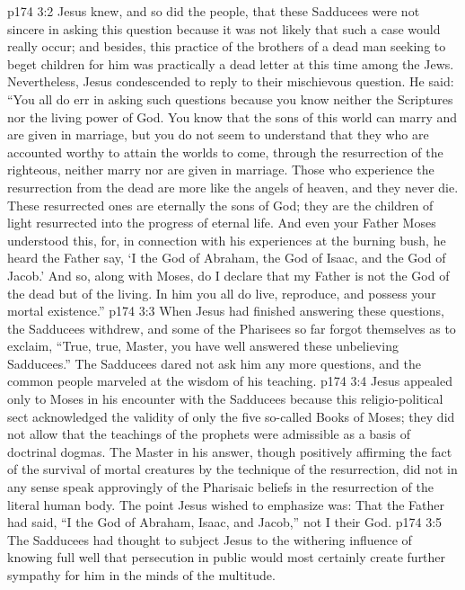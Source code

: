 \vs p174 3:2 Jesus knew, and so did the people, that these Sadducees were not sincere in asking this question because it was not likely that such a case would really occur; and besides, this practice of the brothers of a dead man seeking to beget children for him was practically a dead letter at this time among the Jews. Nevertheless, Jesus condescended to reply to their mischievous question. He said: \textcolor{ubdarkred}{“You all do err in asking such questions because you know neither the Scriptures nor the living power of God. You know that the sons of this world can marry and are given in marriage, but you do not seem to understand that they who are accounted worthy to attain the worlds to come, through the resurrection of the righteous, neither marry nor are given in marriage. Those who experience the resurrection from the dead are more like the angels of heaven, and they never die. These resurrected ones are eternally the sons of God; they are the children of light resurrected into the progress of eternal life. And even your Father Moses understood this, for, in connection with his experiences at the burning bush, he heard the Father say, ‘I  the God of Abraham, the God of Isaac, and the God of Jacob.’ And so, along with Moses, do I declare that my Father is not the God of the dead but of the living. In him you all do live, reproduce, and possess your mortal existence.”}\plusone
\vs p174 3:3 When Jesus had finished answering these questions, the Sadducees withdrew, and some of the Pharisees so far forgot themselves as to exclaim, “True, true, Master, you have well answered these unbelieving Sadducees.” The Sadducees dared not ask him any more questions, and the common people marveled at the wisdom of his teaching.
\pc \vs p174 3:4 Jesus appealed only to Moses in his encounter with the Sadducees because this religio\hyp{}political sect acknowledged the validity of only the five so\hyp{}called Books of Moses; they did not allow that the teachings of the prophets were admissible as a basis of doctrinal dogmas. The Master in his answer, though positively affirming the fact of the survival of mortal creatures by the technique of the resurrection, did not in any sense speak approvingly of the Pharisaic beliefs in the resurrection of the literal human body. The point Jesus wished to emphasize was: That the Father had said, “I  the God of Abraham, Isaac, and Jacob,” not I  their God.
\vs p174 3:5 The Sadducees had thought to subject Jesus to the withering influence of  knowing full well that persecution in public would most certainly create further sympathy for him in the minds of the multitude.
